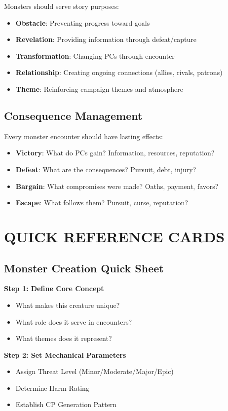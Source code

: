 \documentclass[12pt]{article}
\begin{document}
\begin{itemize}
Monsters should serve story purposes:
\begin{itemize}
\item \textbf{Obstacle}: Preventing progress toward goals
\item \textbf{Revelation}: Providing information through defeat/capture
\item \textbf{Transformation}: Changing PCs through encounter
\item \textbf{Relationship}: Creating ongoing connections (allies, rivals, patrons)
\item \textbf{Theme}: Reinforcing campaign themes and atmosphere
\end{itemize}

\subsection*{Consequence Management}

Every monster encounter should have lasting effects:
\begin{itemize}
\item \textbf{Victory}: What do PCs gain? Information, resources, reputation?
\item \textbf{Defeat}: What are the consequences? Pursuit, debt, injury?
\item \textbf{Bargain}: What compromises were made? Oaths, payment, favors?
\item \textbf{Escape}: What follows them? Pursuit, curse, reputation?
\end{itemize}

\section{QUICK REFERENCE CARDS}

\subsection*{Monster Creation Quick Sheet}

\textbf{Step 1: Define Core Concept}
\begin{itemize}
\item What makes this creature unique?
\item What role does it serve in encounters?
\item What themes does it represent?
\end{itemize}

\textbf{Step 2: Set Mechanical Parameters}
\begin{itemize}
\item Assign Threat Level (Minor/Moderate/Major/Epic)
\item Determine Harm Rating
\item Establish CP Generation Pattern
\end{itemize}


\end{itemize}
\end{document}
